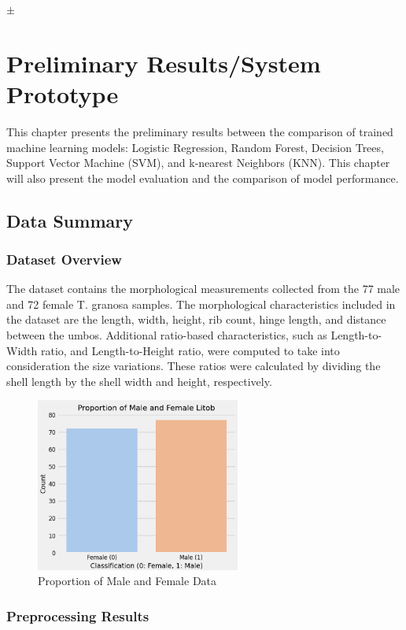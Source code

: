\ensuremath{\pm}


\chapter{Preliminary Results/System Prototype}
This chapter presents the preliminary results between the comparison of trained machine learning models: Logistic Regression, Random Forest,  Decision Trees, Support Vector Machine (SVM), and k-nearest Neighbors (KNN).  This chapter will also present the model evaluation and the comparison of model performance. 

\section{Data Summary}
\subsection{Dataset Overview}

The dataset contains the morphological measurements collected from the 77 male and 72 female T. granosa samples. The morphological characteristics included in the dataset are the length, width, height, rib count, hinge length, and distance between the umbos. Additional ratio-based characteristics, such as Length-to-Width ratio, and Length-to-Height ratio, were computed to take into consideration the size variations. These ratios were calculated by dividing the shell length by the shell width and height, respectively. 

\begin{figure}[!htbp]
	\centering
	\includegraphics[width=0.6\textwidth]{figures/test-train.png}
	\caption{Proportion of Male and Female Data}
	\label{fig:test-train}
\end{figure}

\subsection{Preprocessing Results}

